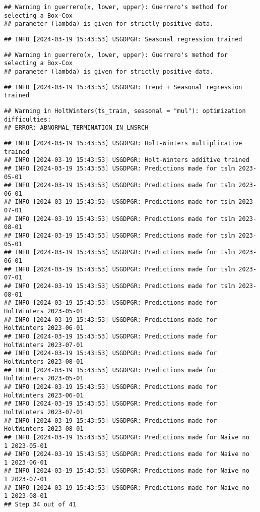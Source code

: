 \documentclass[
]{article}
\begin{document}
\begin{verbatim}
## Warning in guerrero(x, lower, upper): Guerrero's method for selecting a Box-Cox
## parameter (lambda) is given for strictly positive data.
\end{verbatim}

\begin{verbatim}
## INFO [2024-03-19 15:43:53] USGDPGR: Seasonal regression trained
\end{verbatim}

\begin{verbatim}
## Warning in guerrero(x, lower, upper): Guerrero's method for selecting a Box-Cox
## parameter (lambda) is given for strictly positive data.
\end{verbatim}

\begin{verbatim}
## INFO [2024-03-19 15:43:53] USGDPGR: Trend + Seasonal regression trained
\end{verbatim}

\begin{verbatim}
## Warning in HoltWinters(ts_train, seasonal = "mul"): optimization difficulties:
## ERROR: ABNORMAL_TERMINATION_IN_LNSRCH
\end{verbatim}

\begin{verbatim}
## INFO [2024-03-19 15:43:53] USGDPGR: Holt-Winters multiplicative trained
## INFO [2024-03-19 15:43:53] USGDPGR: Holt-Winters additive trained
## INFO [2024-03-19 15:43:53] USGDPGR: Predictions made for tslm 2023-05-01
## INFO [2024-03-19 15:43:53] USGDPGR: Predictions made for tslm 2023-06-01
## INFO [2024-03-19 15:43:53] USGDPGR: Predictions made for tslm 2023-07-01
## INFO [2024-03-19 15:43:53] USGDPGR: Predictions made for tslm 2023-08-01
## INFO [2024-03-19 15:43:53] USGDPGR: Predictions made for tslm 2023-05-01
## INFO [2024-03-19 15:43:53] USGDPGR: Predictions made for tslm 2023-06-01
## INFO [2024-03-19 15:43:53] USGDPGR: Predictions made for tslm 2023-07-01
## INFO [2024-03-19 15:43:53] USGDPGR: Predictions made for tslm 2023-08-01
## INFO [2024-03-19 15:43:53] USGDPGR: Predictions made for HoltWinters 2023-05-01
## INFO [2024-03-19 15:43:53] USGDPGR: Predictions made for HoltWinters 2023-06-01
## INFO [2024-03-19 15:43:53] USGDPGR: Predictions made for HoltWinters 2023-07-01
## INFO [2024-03-19 15:43:53] USGDPGR: Predictions made for HoltWinters 2023-08-01
## INFO [2024-03-19 15:43:53] USGDPGR: Predictions made for HoltWinters 2023-05-01
## INFO [2024-03-19 15:43:53] USGDPGR: Predictions made for HoltWinters 2023-06-01
## INFO [2024-03-19 15:43:53] USGDPGR: Predictions made for HoltWinters 2023-07-01
## INFO [2024-03-19 15:43:53] USGDPGR: Predictions made for HoltWinters 2023-08-01
## INFO [2024-03-19 15:43:53] USGDPGR: Predictions made for Naive no  1 2023-05-01
## INFO [2024-03-19 15:43:53] USGDPGR: Predictions made for Naive no  1 2023-06-01
## INFO [2024-03-19 15:43:53] USGDPGR: Predictions made for Naive no  1 2023-07-01
## INFO [2024-03-19 15:43:53] USGDPGR: Predictions made for Naive no  1 2023-08-01
## Step 34 out of 41
\end{verbatim}
\end{document}
